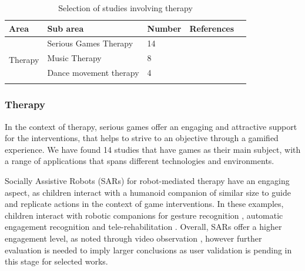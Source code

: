 \documentclass[a4paper,fleqn]{cas-sc}
\begin{document}
\begin{table}[h]
\centering
\begin{tabular*}{6.2in}{p{0.7in}|p{0.85in}|p{0.36in}|p{3.5in}p{0in}}
\hline
Area   & Sub area   & Number & References  &  \\ \hline
\multirow{5}{*}{\centering Therapy}
    & Serious Games Therapy & 14 & \cite{Raygoza-Romero21, DeCarolis21, Simeoli20, Telisheva20,  Rosly20, Martinez-Mones19, Wasserman19, Ruiz-Rodriguez19, Ardalan19, Crowell18, AltizerJr18, Caro18, Sharma18, Castelhano17}
    &  \\\cline{2-4}
    & Music Therapy  & 8 & \cite{Ragone22, Mcgowan21, Ma21, Ragone20, Vargas20, Ragone20OS, Yi-Hsiang18, McGowan17} &  \\
    \cline{2-4} 
    & Dance movement therapy & 4 & \cite{Brown22, Trajkova20, Ringland19, Suzuki17} &  \\
     \cline{1-4}
\end{tabular*}
\caption{Selection of studies involving therapy}
\label{TABLE:area-therapy}
\end{table}

\subsubsection{Therapy}
\label{sec:app-contexts-therapy}
In the context of therapy, serious games offer an engaging and attractive support for the interventions, that helps to strive to an objective through a gamified experience. We have found 14 studies that have games as their main subject, with a range of applications that spans different technologies and environments.

Socially Assistive Robots (SARs) for robot-mediated therapy have an engaging aspect, as children interact with a humanoid companion of similar size to guide and replicate actions in the context of game interventions. In these examples, children interact with robotic companions for gesture recognition \cite{DeCarolis21}, automatic engagement recognition \cite{Telisheva20} and tele-rehabilitation \cite{Rosly20}. Overall, SARs offer a higher engagement level, as noted through video observation \cite{Telisheva20} , however further evaluation is needed to imply larger conclusions as user validation  is pending in this stage for selected works.
\end{document}
